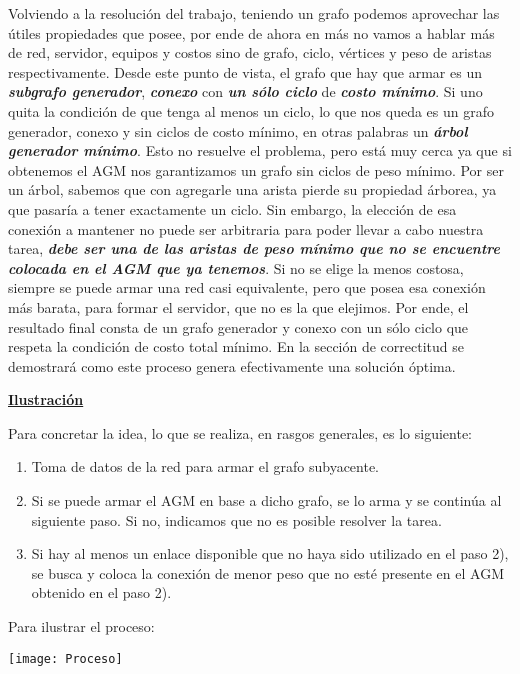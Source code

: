 \documentclass[10pt,a4paper]{article}
\begin{document}
Volviendo a la resolución del trabajo, teniendo un grafo podemos aprovechar las útiles propiedades que posee, por ende de ahora en más no vamos a hablar más de red, servidor, equipos y costos sino de grafo, ciclo, vértices y peso de aristas respectivamente. Desde este punto de vista, el grafo que hay que armar es un \textbf{\textit{subgrafo generador}}, \textbf{\textit{conexo}} con \textbf{\textit{un sólo ciclo}} de \textbf{\textit{costo mínimo}}. Si uno quita la condición de que tenga al menos un ciclo, lo que nos queda es un grafo generador, conexo y sin ciclos de costo mínimo, en otras palabras un \textbf{\textit{árbol generador mínimo}}. Esto no resuelve el problema, pero está muy cerca ya que si obtenemos el AGM nos garantizamos un grafo sin ciclos de peso mínimo. Por ser un árbol, sabemos que con agregarle una arista pierde su propiedad árborea, ya que pasaría a tener exactamente un ciclo. Sin embargo, la elección de esa conexión a mantener no puede ser arbitraria para poder llevar a cabo nuestra tarea,  \textbf{\textit{debe ser una de las aristas de peso mínimo que no se encuentre colocada en el AGM que ya tenemos}}. Si no se elige la menos costosa, siempre se puede armar una red casi equivalente, pero que posea esa conexión más barata, para formar el servidor, que no es la que elejimos. Por ende, el resultado final consta de un grafo generador y conexo con un sólo ciclo que respeta la condición de costo total mínimo. En la sección de correctitud se demostrará como este proceso genera efectivamente una solución óptima.

\noindent \textbf{\underline{Ilustración}}

Para concretar la idea, lo que se realiza, en rasgos generales, es lo siguiente:

\begin{enumerate}
\item Toma de datos de la red para armar el grafo subyacente.
\item Si se puede armar el AGM en base a dicho grafo, se lo arma y se continúa al siguiente paso. Si no, indicamos que no es posible resolver la tarea.
\item Si hay al menos un enlace disponible que no haya sido utilizado en el paso 2), se busca y coloca la conexión de menor peso que no esté presente en el AGM obtenido en el paso 2).
\end{enumerate}

Para ilustrar el proceso:

\texttt{[image: Proceso]}
\end{document}
